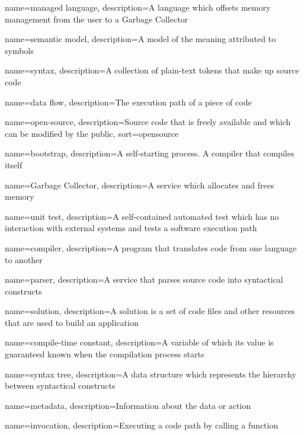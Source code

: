 
{
	name={managed language},
	description={A language which offsets memory management from the user to a Garbage Collector}
}


{
	name={semantic model},
	description={A model of the meaning attributed to symbols}
}

{
	name={syntax},
	description={A collection of plain-text tokens that make up source code}
}

{
	name={data flow},
	description={The execution path of a piece of code}
}

{
	name={open-source},
	description={Source code that is freely available and which can be modified by the public},
	sort={opensource}
}

{
	name={bootstrap},
	description={A self-starting process. A compiler that compiles itself}
}

{
	name={Garbage Collector},
	description={A service which allocates and frees memory}
}

{
	name={unit test},
	description={A self-contained automated test which has no interaction with external systems and tests a software execution path}
}

{
	name={compiler},
	description={A program that translates code from one language to another}
}


{
	name={parser},
	description={A service that parses source code into syntactical constructs}
}


{
	name={solution},
	description={A solution is a set of code files and other resources that are used to build an application}
}

{
	name={compile-time constant},
	description={A variable of which its value is guaranteed known when the compilation process starts}
}

{
	name={syntax tree},
	description={A data structure which represents the hierarchy between syntactical constructs}
}

{
	name={metadata},
	description={Information about the data or action}
}

{
	name={invocation},
	description={Executing a code path by calling a function}
}











